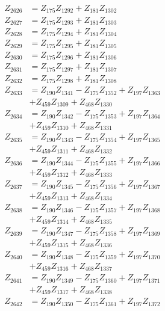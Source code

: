 \begin{multicols}{2}
\begin{align}
Z_{2626} &= Z_{175}Z_{1292} + Z_{181}Z_{1302} \nonumber \\
Z_{2627} &= Z_{175}Z_{1293} + Z_{181}Z_{1303} \nonumber \\
Z_{2628} &= Z_{175}Z_{1294} + Z_{181}Z_{1304} \nonumber \\
Z_{2629} &= Z_{175}Z_{1295} + Z_{181}Z_{1305} \nonumber \\
Z_{2630} &= Z_{175}Z_{1296} + Z_{181}Z_{1306} \nonumber \\
Z_{2631} &= Z_{175}Z_{1297} + Z_{181}Z_{1307} \nonumber \\
Z_{2632} &= Z_{175}Z_{1298} + Z_{181}Z_{1308} \nonumber \\
Z_{2633} &= Z_{190}Z_{1341} - Z_{175}Z_{1352} + Z_{197}Z_{1363}  \nonumber \\
&+ Z_{459}Z_{1309} + Z_{468}Z_{1330} \nonumber \\
Z_{2634} &= Z_{190}Z_{1342} - Z_{175}Z_{1353} + Z_{197}Z_{1364}  \nonumber \\
&+ Z_{459}Z_{1310} + Z_{468}Z_{1331} \nonumber \\
Z_{2635} &= Z_{190}Z_{1343} - Z_{175}Z_{1354} + Z_{197}Z_{1365}  \nonumber \\
&+ Z_{459}Z_{1311} + Z_{468}Z_{1332} \nonumber \\
Z_{2636} &= Z_{190}Z_{1344} - Z_{175}Z_{1355} + Z_{197}Z_{1366}  \nonumber \\
&+ Z_{459}Z_{1312} + Z_{468}Z_{1333} \nonumber \\
Z_{2637} &= Z_{190}Z_{1345} - Z_{175}Z_{1356} + Z_{197}Z_{1367}  \nonumber \\
&+ Z_{459}Z_{1313} + Z_{468}Z_{1334} \nonumber \\
Z_{2638} &= Z_{190}Z_{1346} - Z_{175}Z_{1357} + Z_{197}Z_{1368}  \nonumber \\
&+ Z_{459}Z_{1314} + Z_{468}Z_{1335} \nonumber \\
Z_{2639} &= Z_{190}Z_{1347} - Z_{175}Z_{1358} + Z_{197}Z_{1369}  \nonumber \\
&+ Z_{459}Z_{1315} + Z_{468}Z_{1336} \nonumber \\
Z_{2640} &= Z_{190}Z_{1348} - Z_{175}Z_{1359} + Z_{197}Z_{1370}  \nonumber \\
&+ Z_{459}Z_{1316} + Z_{468}Z_{1337} \nonumber \\
Z_{2641} &= Z_{190}Z_{1349} - Z_{175}Z_{1360} + Z_{197}Z_{1371}  \nonumber \\
&+ Z_{459}Z_{1317} + Z_{468}Z_{1338} \nonumber \\
Z_{2642} &= Z_{190}Z_{1350} - Z_{175}Z_{1361} + Z_{197}Z_{1372}  \nonumber \\

\end{align}
\end{multicols}
